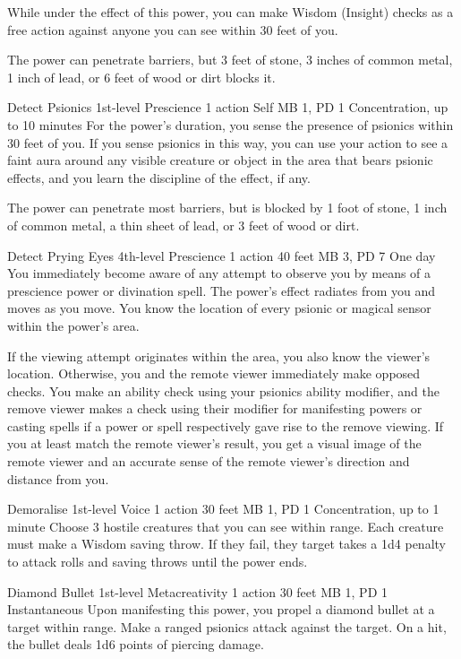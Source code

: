   While under the effect of this power,
  you can make Wisdom (Insight) checks as a free action
  against anyone you can see within 30 feet of you.
  
  The power can penetrate barriers, but 3 feet of stone,
  3 inches of common metal,
  1 inch of lead,
  or 6 feet of wood or dirt blocks it.

\DndPowerHeader%
  {Detect Psionics}
  {1st-level Prescience}
  {1 action}
  {Self}
  {MB 1, PD 1}
  {Concentration, up to 10 minutes}
For the power's duration,
you sense the presence of psionics within 30 feet of you.
If you sense psionics in this way,
you can use your action to see a faint aura around
any visible creature or object in the area that bears psionic effects,
and you learn the discipline of the effect, if any.

The power can penetrate most barriers, but is blocked by
1 foot of stone,
1 inch of common metal,
a thin sheet of lead,
or 3 feet of wood or dirt.

\DndPowerHeader%
  {Detect Prying Eyes}
  {4th-level Prescience}
  {1 action}
  {40 feet}
  {MB 3, PD 7}
  {One day}
  You immediately become aware of any attempt to observe you
  by means of a prescience power or divination spell.
  The power's effect radiates from you and moves as you move.
  You know the location of every psionic or magical sensor
  within the power's area.

  If the viewing attempt originates within the area,
  you also know the viewer's location.
  Otherwise, you and the remote viewer immediately make opposed checks.
  You make an ability check using your psionics ability modifier,
  and the remove viewer makes a check using their modifier
  for manifesting powers or casting spells if a power or spell
  respectively gave rise to the remove viewing.
  If you at least match the remote viewer's result,
  you get a visual image of the remote viewer
  and an accurate sense of the remote viewer's
  direction and distance from you.

\DndPowerHeader%
  {Demoralise}
  {1st-level Voice}
  {1 action}
  {30 feet}
  {MB 1, PD 1}
  {Concentration, up to 1 minute}
Choose 3 hostile creatures that you can see within range.
Each creature must make a Wisdom saving throw.
If they fail, they target takes a 1d4 penalty to attack rolls and
saving throws until the power ends.

\DndPowerHeader%
  {Diamond Bullet}
  {1st-level Metacreativity}
  {1 action}
  {30 feet}
  {MB 1, PD 1}
  {Instantaneous}
  Upon manifesting this power,
  you propel a diamond bullet at a target within range.
  Make a ranged psionics attack against the target.
  On a hit, the bullet deals 1d6 points of piercing damage.

